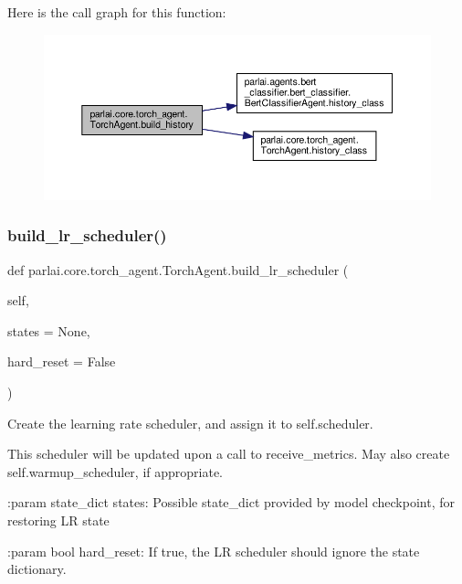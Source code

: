 Here is the call graph for this function\+:
\nopagebreak
\begin{figure}[H]
\begin{center}
\leavevmode
\includegraphics[width=350pt]{classparlai_1_1core_1_1torch__agent_1_1TorchAgent_ab22f61f153b522f429210c61eed2d5af_cgraph}
\end{center}
\end{figure}
\mbox{\label{classparlai_1_1core_1_1torch__agent_1_1TorchAgent_aa51ac42dc34e3d2281a01cba78a96151}} 
\subsubsection{\texorpdfstring{build\+\_\+lr\+\_\+scheduler()}{build\_lr\_scheduler()}}
{\footnotesize\ttfamily def parlai.\+core.\+torch\+\_\+agent.\+Torch\+Agent.\+build\+\_\+lr\+\_\+scheduler (\begin{DoxyParamCaption}\item[{}]{self,  }\item[{}]{states = {\ttfamily None},  }\item[{}]{hard\+\_\+reset = {\ttfamily False} }\end{DoxyParamCaption})}

\begin{DoxyVerb}Create the learning rate scheduler, and assign it to self.scheduler.

This scheduler will be updated upon a call to receive_metrics.
May also create self.warmup_scheduler, if appropriate.

:param state_dict states: Possible state_dict provided by model
    checkpoint, for restoring LR state

:param bool hard_reset: If true, the LR scheduler should ignore the
    state dictionary.
\end{DoxyVerb}
 

